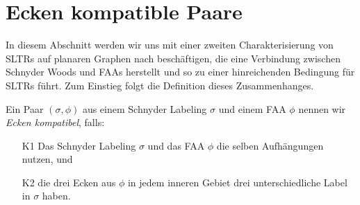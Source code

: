 \section{Ecken kompatible Paare}

In diesem Abschnitt werden wir uns mit einer zweiten Charakterisierung von SLTRs auf planaren Graphen nach \cite{af15} beschäftigen, die eine Verbindung zwischen Schnyder Woods und FAAs herstellt und so zu einer hinreichenden Bedingung für SLTRs führt. Zum Einstieg folgt die Definition dieses Zusammenhanges.

\begin{definition}\label{def_ccc}
Ein Paar $(\sigma,\phi)$ aus einem Schnyder Labeling $\sigma$ und einem FAA $\phi$ nennen wir \textit{Ecken kompatibel}, falls:
\begin{itemize}
\item [K1] Das Schnyder Labeling $\sigma$ und das FAA $\phi$ die selben Aufhängungen nutzen, und
\item [K2] die drei Ecken aus $\phi$ in jedem inneren Gebiet drei unterschiedliche Label in $\sigma$ haben.
\end{itemize}
\end{definition}

